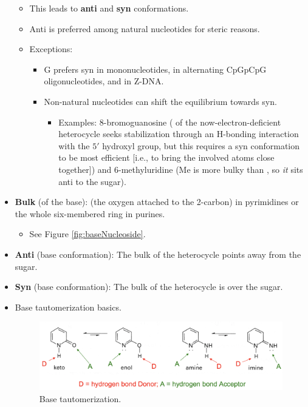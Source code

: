 \documentclass[../notes.tex]{subfiles}
\begin{document}
\begin{itemize}
\begin{itemize}
        \item This leads to \textbf{anti} and \textbf{syn} conformations.
        \item Anti is preferred among natural nucleotides for steric reasons.
        \item Exceptions:
        \begin{itemize}
            \item G prefers syn in mononucleotides, in alternating CpGpCpG oligonucleotides, and in Z-DNA.
            \item Non-natural nucleotides can shift the equilibrium towards syn.
            \begin{itemize}
                \item Examples: 8-bromoguanosine ( of the now-electron-deficient heterocycle seeks stabilization through an H-bonding interaction with the $5'$ hydroxyl group, but this requires a syn conformation to be most efficient [i.e., to bring the involved atoms close together]) and 6-methyluridine (Me is more bulky than , so \emph{it} sits anti to the sugar).
            \end{itemize}
        \end{itemize}
    \end{itemize}
    \item \textbf{Bulk} (of the base):  (the oxygen attached to the 2-carbon) in pyrimidines or the whole six-membered ring in purines.
    \begin{itemize}
        \item See Figure \ref{fig:baseNucleoside}.
    \end{itemize}
    \item \textbf{Anti} (base conformation): The bulk of the heterocycle points away from the sugar.
    \item \textbf{Syn} (base conformation): The bulk of the heterocycle is over the sugar.
    \item Base tautomerization basics.
    \begin{figure}[h!]
        \centering
        \includegraphics[width=0.7\linewidth]{../ExtFiles/baseTautomerization.png}
        \caption{Base tautomerization.}
        \label{fig:baseTautomerization}

\end{figure}
\end{itemize}
\end{document}

